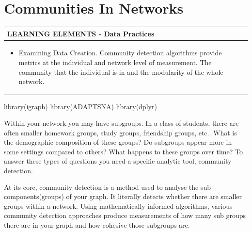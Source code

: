 \documentclass[
  letterpaper,
  DIV=11,
  numbers=noendperiod]{scrreprt}
\newenvironment{Shaded}{\begin{snugshade}}{\end{snugshade}}
\newcommand{\FunctionTok}[1]{\textcolor[rgb]{0.28,0.35,0.67}{#1}}
\newcommand{\NormalTok}[1]{\textcolor[rgb]{0.00,0.23,0.31}{#1}}
\providecommand{\tightlist}{%
  \setlength{\itemsep}{0pt}\setlength{\parskip}{0pt}}\usepackage{longtable,booktabs,array}
\begin{document}
\chapter{Communities In Networks}\label{communities-in-networks}

\begin{longtable}[]{@{}
  >{\raggedright\arraybackslash}p{}@{}}
\toprule\noalign{}
\begin{minipage}[b]{\linewidth}\raggedright
LEARNING ELEMENTS - Data Practices
\end{minipage} \\
\midrule\noalign{}
\endhead
\bottomrule\noalign{}
\endlastfoot
\begin{minipage}[t]{\linewidth}\raggedright
\begin{itemize}
\tightlist
\item
  Examining Data Creation. Community detection algorithms provide
  metrics at the individual and network level of measurement. The
  community that the individual is in and the modularity of the whole
  network.
\end{itemize}
\end{minipage} \\
\end{longtable}

\begin{Shaded}
\begin{Highlighting}[]
\FunctionTok{library}\NormalTok{(igraph)}
\FunctionTok{library}\NormalTok{(ADAPTSNA)}
\FunctionTok{library}\NormalTok{(dplyr)}
\end{Highlighting}
\end{Shaded}

Within your network you may have subgroups. In a class of students,
there are often smaller homework groups, study groups, friendship
groups, etc.. What is the demographic composition of these groups? Do
subgroups appear more in some settings compared to others? What happens
to these groups over time? To answer these types of questions you need a
specific analytic tool, community detection.

At its core, community detection is a method used to analyse the sub
components(groups) of your graph. It literally detects whether there are
smaller groups within a network. Using mathematically informed
algorithms, various community detection approaches produce measurements
of how many sub groups there are in your graph and how cohesive those
subgroups are.
\end{document}
